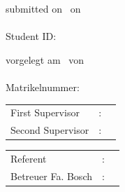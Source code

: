 \begin{titlepage}
	\vfill
	
	\ifdefined\ThesisLanguageIsEnglish 
  		\begin{center}
    			\Large submitted on \ThesisDeliveryDate\ on\\
    			\vspace{0.3cm}
    			\Large \textbf{\myName}\\
    			\vspace{0.3cm}
    			\normalsize Student ID: \myStudentId
  		\end{center}
  	\else
		\begin{center}
			\Large vorgelegt am \ThesisDeliveryDate\ von\\
			\vspace{0.3cm}
			\Large \textbf{\myName}\\
			\vspace{0.3cm}
			\normalsize Matrikelnummer: \myStudentId
		\end{center}
  	\fi
	
	\vfill
	
	\ifdefined\ThesisLanguageIsEnglish 
		\begin{center}
			\begin{tabular}{lll}
				First Supervisor    & : & \Supervisor \\     %
				Second Supervisor & : & \CoSupervisor\\    %
			\end{tabular}
		\end{center}
	\else
		\begin{center}
			\begin{tabular}{lll}
				Referent    & : & \Supervisor \\     %
				Betreuer Fa. Bosch & : & \CompSupervisor\\    %
			\end{tabular}
		\end{center} 
	\fi
	
	\newpage
	
\end{titlepage}
 
